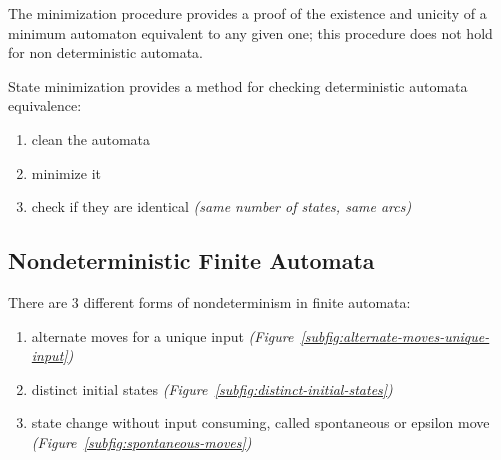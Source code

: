 \documentclass[english]{article}
\begin{document}
The minimization procedure provides a proof of the existence and unicity of a minimum automaton equivalent to any given one;
this procedure does not hold for non deterministic automata.

State minimization provides a method for checking deterministic automata equivalence:

\begin{enumerate}
  \item clean the automata
  \item minimize it
  \item check if they are identical \textit{(same number of states, same arcs)}
\end{enumerate}

\subsection{Nondeterministic Finite Automata}

There are \(3\) different forms of nondeterminism in finite automata:

\begin{enumerate}
  \item alternate moves for a unique input \textit{(Figure~\ref{subfig:alternate-moves-unique-input})}
  \item distinct initial states \textit{(Figure~\ref{subfig:distinct-initial-states})}
  \item state change without input consuming, called spontaneous or epsilon move \textit{(Figure~\ref{subfig:spontaneous-moves})}
\end{enumerate}
\end{document}

